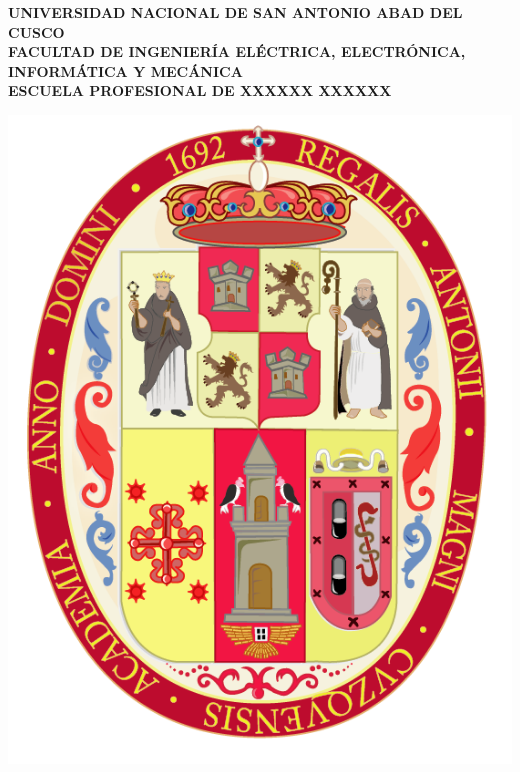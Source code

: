\begin{titlepage}
   \begin{center}
       
       {\large \textbf{UNIVERSIDAD NACIONAL DE SAN ANTONIO ABAD DEL CUSCO}}\\
       \vspace{0.5cm}
       {\normalsize\textbf{FACULTAD DE INGENIERÍA ELÉCTRICA, ELECTRÓNICA, INFORMÁTICA Y MECÁNICA}}\\
       \vspace{0.5cm}
       {\normalsize\textbf{ESCUELA PROFESIONAL DE XXXXXX XXXXXX}}\\
       
       \vspace{1cm}
       
       \includegraphics[scale=0.26]{figuras/logo.png}\\
       
       \vspace{1cm}
       

\end{center}
\end{titlepage}

